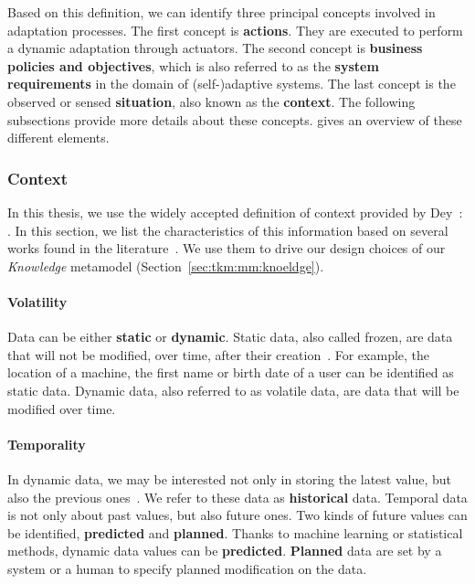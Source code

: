 Based on this definition, we can identify three principal concepts involved in adaptation processes.
The first concept is \textbf{actions}. 
They are executed to perform a dynamic adaptation through actuators.
The second concept is \textbf{business policies and objectives}, which is also referred to as the \textbf{system requirements} in the domain of (self-)adaptive systems.
The last concept is the observed or sensed \textbf{situation}, also known as the \textbf{context}.
The following subsections provide more details about these concepts.
 gives an overview of these different elements.

\subsubsection{Context}

In this thesis, we use the widely accepted definition of context provided by \linebreak Dey~\cite{DBLP:journals/puc/Dey01}: .
In this section, we list the characteristics of this information based on several works found in the literature~\cite{DBLP:conf/pervasive/HenricksenIR02, DBLP:conf/seke/0001FNMKT14, DBLP:journals/percom/BettiniBHINRR10, DBLP:journals/comsur/PereraZCG14}.
We use them to drive our design choices of our \textit{Knowledge} \gls{metamodel} (\cf Section~\ref{sec:tkm:mm:knoeldge}).

\paragraph{Volatility}
Data can be either \textbf{static} or \textbf{dynamic}.
Static data, also called frozen, are data that will not be modified, over time, after their creation~\cite{DBLP:conf/pervasive/HenricksenIR02, DBLP:journals/comsur/MakrisSS13, DBLP:journals/percom/BettiniBHINRR10}.
For example, the location of a machine, the first name or birth date of a user can be identified as static data. 
Dynamic data, also referred to as volatile data, are data that will be modified over time.

\paragraph{Temporality}
In dynamic data, we may be interested not only in storing the latest value, but also the previous ones~\cite{DBLP:conf/seke/0001FNMKT14, DBLP:conf/pervasive/HenricksenIR02}. 
We refer to these data as \textbf{historical} data.
Temporal data is not only about past values, but also future ones. 
Two kinds of future values can be identified, \textbf{predicted} and \textbf{planned}.  
Thanks to machine learning or statistical methods, dynamic data values can be \textbf{predicted}. 
\textbf{Planned} data are set by a system or a human to specify planned modification on the data.

